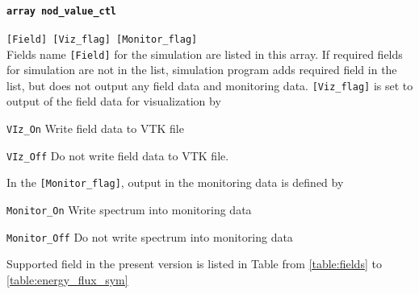 \paragraph{\tt array nod\_value\_ctl}
\label{href_t:nod_value_ctl}
\verb|[Field] [Viz_flag] [Monitor_flag]| \\
Fields name \verb|[Field]| for the simulation are listed in this array. If required fields for simulation are not in the list, simulation program adds required field in the list, but does not output any field data and monitoring data. \verb|[Viz_flag]| is set to output of the field data for visualization by
%
\begin{description}
\item{\tt VIz\_On}  Write field data to VTK file
\item{\tt VIz\_Off} Do not write field data to VTK file.
\end{description}
%
In the \verb|[Monitor_flag]|, output in the monitoring data is defined by
%
\begin{description}
\item{\tt Monitor\_On}  Write spectrum into monitoring data
\item{\tt Monitor\_Off} Do not write spectrum into monitoring data
\end{description}
%
Supported field in the present version is listed in Table from \ref{table:fields} to \ref{table:energy_flux_sym} 
%

